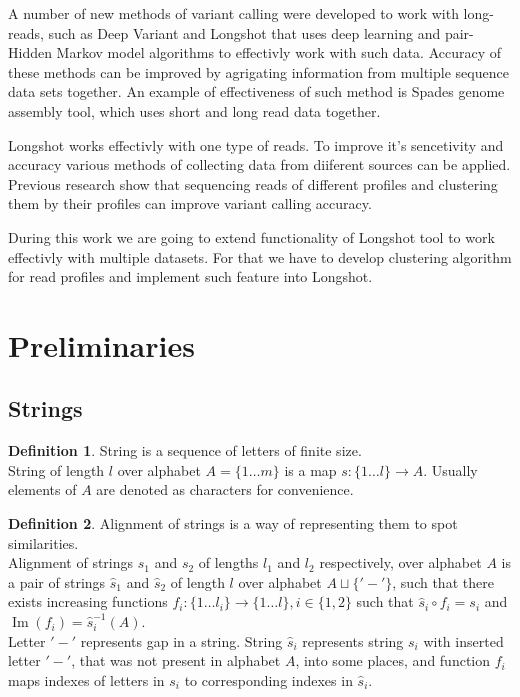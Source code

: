 \documentclass[a4paper, 12pt]{article}
\DeclareMathOperator{\Image}{Im}
\theoremstyle{definition}
\newtheorem{definition}{Definition}[section]
\theoremstyle{definition}
\theoremstyle{remark}
\begin{document}
A number of new methods of variant calling were developed 
to work with long-reads, such as Deep Variant
and Longshot that uses deep learning 
and pair-Hidden Markov model algorithms to effectivly work with 
such data.  
Accuracy of these methods can be improved by agrigating 
information from multiple sequence data sets together. 
An example of effectiveness of such method is 
Spades genome assembly tool, which uses short and long 
read data together.  

Longshot works effectivly with one type of reads. 
To improve it's sencetivity and accuracy various 
methods of collecting data from diiferent sources 
can be applied. 
Previous research show that sequencing reads of 
different profiles and clustering them 
by their profiles can improve variant calling accuracy.

During this work we are going to extend functionality of 
Longshot tool to work effectivly with multiple datasets. 
For that we have to develop clustering algorithm for 
read profiles and implement such feature into Longshot. 

\section{Preliminaries}
\subsection{Strings}

\begin{definition}
    String is a sequence of letters of finite size. \\
    String of length $l$ over alphabet $A = \{ 1 \ldots m \}$ is a map $s: \{ 1 \ldots l\} \rightarrow A$.
    Usually elements of $A$ are denoted as characters for convenience.
\end{definition}

\begin{definition}
    Alignment of strings is a way of representing them to spot similarities. \\
    Alignment of strings $s_1$ and $s_2$ of lengths $l_1$ and $l_2$ respectively, 
    over alphabet $A$ is a pair of strings $\hat{s}_1$ and $\hat{s}_2$ 
    of length $l$ over alphabet $A \sqcup \{ '-' \}$, 
    such that there exists increasing functions $f_i: \{1 \ldots l_i \} \rightarrow \{ 1 \ldots l\}, i \in \{1, 2\}$ 
    such that $\hat{s}_i \circ f_i = s_i$ and $\Image (f_i) = \hat{s}_i^{-1}(A)$. \\
    
    Letter $'-'$ represents gap in a string. 
    String $\hat{s}_i$ represents string $s_i$ with inserted letter $'-'$, 
    that was not present in alphabet $A$, into some places, 
    and function $f_i$ maps indexes of letters in $s_i$ to corresponding indexes in $\hat{s}_i$.
\end{definition}
\end{document}
